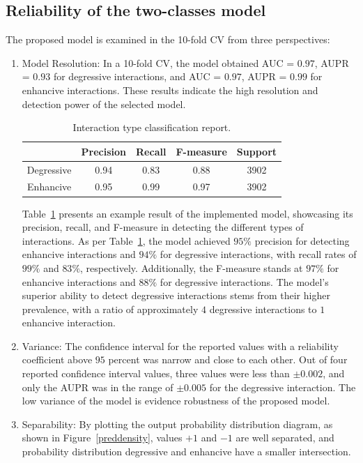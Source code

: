 \documentclass[unnumsec,webpdf,contemporary,large]{oup-authoring-template}%
\theoremstyle{thmstyleone}%
\theoremstyle{thmstyletwo}%
\theoremstyle{thmstylethree}%
\begin{document}
\subsection{Reliability of the two-classes model}
The proposed model is examined in the 10-fold CV from three perspectives:
\begin{enumerate}
    \item Model Resolution: In a 10-fold CV, the model obtained AUC = $0.97$, AUPR = $0.93$ for degressive interactions, and AUC = $0.97$, AUPR = $0.99$ for enhancive interactions. These results indicate the high resolution and detection power of the selected model.

\begin{table}
\begin{tabular}{|c|c|c|c|c|}
 \hline
         & Precision& Recall& F-measure& Support
\\\hline
        Degressive&0.94&0.83&0.88&3902\\
Enhancive&0.95&0.99&0.97&
3902\\
\hline
\end{tabular}
\caption{Interaction type classification report.}
\label{t2}
\end{table}
Table~\ref{t2} presents an example result of the implemented model, showcasing its precision, recall, and F-measure in detecting the different types of interactions. As per Table~\ref{t2}, the model achieved $95\%$ precision for detecting enhancive interactions and $94\%$ for degressive interactions, with recall rates of $99\%$ and $83\%$, respectively. Additionally, the F-measure stands at $97\%$ for enhancive interactions and $88\%$ for degressive interactions. The model’s superior ability to detect degressive interactions stems from their higher prevalence, with a ratio of approximately $4$ degressive interactions to $1$ enhancive interaction.
\item Variance: The confidence interval for the reported values with a reliability coefficient above $95$ percent was narrow and close to each other. Out of four reported confidence interval values, three values were less than $\pm0.002$, and only the AUPR was in the range of $\pm0.005$ for the degressive interaction. The low variance of the model is evidence robustness of the proposed model.
\item Separability: By plotting the output probability distribution diagram, as shown in Figure~\ref{preddensity}, values $+1$ and $-1$ are well separated, and probability distribution degressive and enhancive have a smaller intersection.

\end{enumerate}
\end{document}
